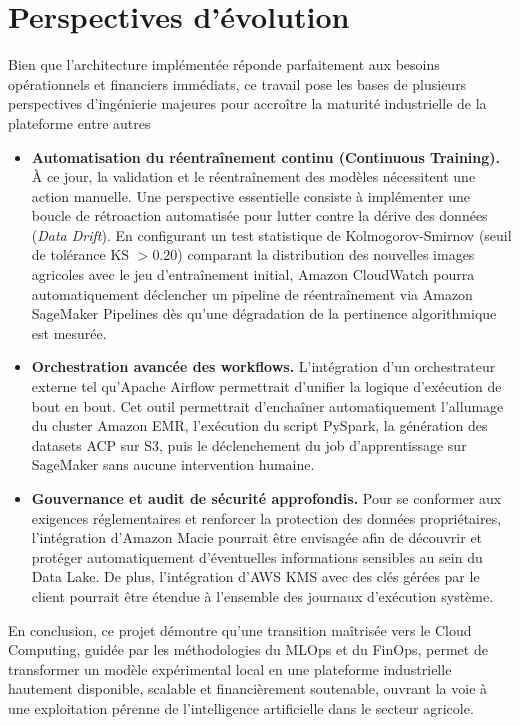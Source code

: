 \section*{Perspectives d'évolution}

Bien que l'architecture implémentée réponde parfaitement aux besoins opérationnels et financiers immédiats, ce travail pose les bases de plusieurs perspectives d'ingénierie majeures pour accroître la maturité industrielle de la plateforme entre autres

\begin{itemize}
    \item[$\bullet$] \textbf{Automatisation du réentraînement continu (Continuous Training).} À ce jour, la validation et le réentraînement des modèles nécessitent une action manuelle. Une perspective essentielle consiste à implémenter une boucle de rétroaction automatisée pour lutter contre la dérive des données (\textit{Data Drift}). En configurant un test statistique de Kolmogorov-Smirnov (seuil de tolérance KS $> 0.20$) comparant la distribution des nouvelles images agricoles avec le jeu d'entraînement initial, Amazon CloudWatch pourra automatiquement déclencher un pipeline de réentraînement via Amazon SageMaker Pipelines dès qu'une dégradation de la pertinence algorithmique est mesurée.
    \item[$\bullet$] \textbf{Orchestration avancée des workflows.} L'intégration d'un orchestrateur externe tel qu'Apache Airflow permettrait d'unifier la logique d'exécution de bout en bout. Cet outil permettrait d'enchaîner automatiquement l'allumage du cluster Amazon EMR, l'exécution du script PySpark, la génération des datasets ACP sur S3, puis le déclenchement du job d'apprentissage sur SageMaker sans aucune intervention humaine.
    \item[$\bullet$] \textbf{Gouvernance et audit de sécurité approfondis.} Pour se conformer aux exigences réglementaires et renforcer la protection des données propriétaires, l'intégration d'Amazon Macie pourrait être envisagée afin de découvrir et protéger automatiquement d'éventuelles informations sensibles au sein du Data Lake. De plus, l'intégration d'AWS KMS avec des clés gérées par le client pourrait être étendue à l'ensemble des journaux d'exécution système.
\end{itemize}

En conclusion, ce projet démontre qu'une transition maîtrisée vers le Cloud Computing, guidée par les méthodologies du MLOps et du FinOps, permet de transformer un modèle expérimental local en une plateforme industrielle hautement disponible, scalable et financièrement soutenable, ouvrant la voie à une exploitation pérenne de l'intelligence artificielle dans le secteur agricole.